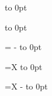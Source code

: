 \def\gridbox#1{%
  \vbox to 0pt{%
    \kern\gridvorigin
    \kern\gridvoffset
    \hbox{%
      \kern\gridhorigin
      \kern\gridhoffset
      \box#1
    }%
    \vss
  }%
  \nointerlineskip
}

\def\gridboxbaseline#1{%
  \begingroup
  \advance\gridvoffset-\ht#1%
  \gridbox#1%
  \endgroup
}


\begintopgrid
\setbox\rbA\copy\bigdot
\gridbox\rbA
\gridvoffset=10mm
\gridhoffset=20mm
\setbox\rbA\copy\bigdot
\gridbox\rbA
\setbox\rbA=\vbox{\nointerlineskip\samplebox{10pt}{20pt}{40pt}{}}
\gridboxbaseline\rbA
\setbox\rbB=\hbox{X}
\boxloadframe\rbB\to\rbA
\gridbox\rbA
\setbox\rbA=\hbox{X}
\gridboxbaseline\rbA
\endgrid

\bye
